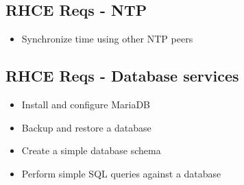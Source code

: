 \documentclass[letterpaper,10pt,english]{sphinxmanual}
\begin{document}
\subsection{RHCE Reqs - NTP}
\label{rhce:rhce-reqs-ntp}\begin{itemize}
\item {} 
Synchronize time using other NTP peers

\end{itemize}


\subsection{RHCE Reqs - Database services}
\label{rhce:rhce-reqs-database-services}\begin{itemize}
\item {} 
Install and configure MariaDB

\item {} 
Backup and restore a database

\item {} 
Create a simple database schema

\item {} 
Perform simple SQL queries against a database

\end{itemize}



\renewcommand{\indexname}{Index}
\printindex
\end{document}
